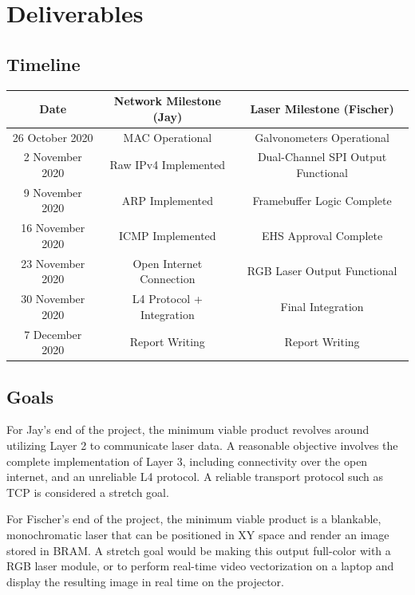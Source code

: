 \documentclass[11pt]{article}
\begin{document}
\section{Deliverables}

\subsection{Timeline}

\begin{center}
\begin{tabular}{ c|c|c } 
 Date & Network Milestone (Jay) & Laser Milestone (Fischer)\\ 
 \hline
 26 October 2020 & MAC Operational & Galvonometers Operational\\ 
 \hline
 2 November 2020 & Raw IPv4 Implemented & Dual-Channel SPI Output Functional \\ 
 \hline
 9 November 2020 & ARP Implemented & Framebuffer Logic Complete \\ 
 \hline
 16 November 2020 & ICMP Implemented & EHS Approval Complete\\ 
 \hline
 23 November 2020 & Open Internet Connection & RGB Laser Output Functional\\ 
 \hline
 30 November 2020 & L4 Protocol + Integration & Final Integration\\ 
 \hline
 7 December 2020 & Report Writing & Report Writing\\ 
 
\end{tabular}
\end{center}

\subsection{Goals}
For Jay's end of the project, the minimum viable product revolves around utilizing Layer 2 to communicate laser data. A reasonable objective involves the complete implementation of Layer 3, including connectivity over the open internet, and an unreliable L4 protocol. A reliable transport protocol such as TCP is considered a stretch goal. \newline

\noindent For Fischer's end of the project, the minimum viable product is a blankable, monochromatic laser that can be positioned in XY space and render an image stored in BRAM. A stretch goal would be making this output full-color with a RGB laser module, or to perform real-time video vectorization on a laptop and display the resulting image in real time on the projector. 
\end{document}
